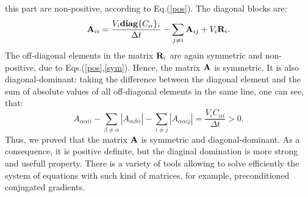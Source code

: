 \documentclass[12pt]{revtex4}
\begin{document}
this part are non-positive, according to Eq.(\ref{pos}). The diagonal blocks are:
\begin{equation}
{\bf A}_{ii} = \frac{V_i{\bf diag}\{C_\alpha\}_i}{\Delta t} -\sum_{j\ne i}{{\bf A}_{ij}} +V_i {\bf R}_i.
\end{equation}
The off-diagonal elements in the matrix ${\bf R}_i$ are again symmetric and non-positive, due to
Eqs.(\ref{pos},\ref{sym}). Hence, the matrix ${\bf A}$ is symmetric. It is also diagonal-dominant: 
taking the difference %
between the diagonal element and the sum of absolute values of all off-diagonal 
elements in the same line, one can see, that:
\begin{equation}
A_{\alpha\alpha ii}-\sum_{\beta\ne\alpha}{|A_{\alpha\beta ii}|}-\sum_{i\ne j}{|A_{\alpha\alpha ij}|}=\frac{V_iC_{\alpha i}}{\Delta t} >0.
\end{equation}
Thus, we proved that the matrix ${\bf A}$ is symmetric and diagonal-dominant. As a consequence,  it is positive definite, but the diaginal 
domination is more strong and usefull property. There is a variety of tools
allowing to solve efficiently the system of equations with such kind of matrices, for example, preconditioned conjugated gradients.
\end{document}
